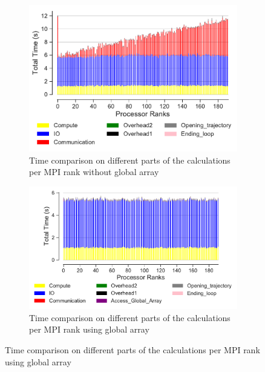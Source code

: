 \begin{figure}[ht!]
\begin{subfigure} {.45\textwidth}
  \includegraphics[width=\linewidth]{figures/split-BarPlot-rank-comparison_192_5.pdf}
   \caption{Time comparison on different parts of the calculations per MPI rank without global array}
  \label{fig:MPIranks-split}
\end{subfigure}
\hfill
\begin{subfigure} {.45\textwidth}
  \includegraphics[width=\linewidth]{figures/split-ga-BarPlot-rank-comparison_192_5.pdf}
  \caption{Time comparison on different parts of the calculations per MPI rank using global array}
  \label{fig:MPIranks-split-ga}
\end{subfigure}


\end{figure}
